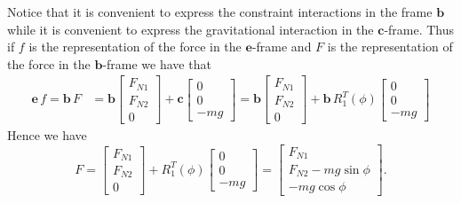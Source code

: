 \documentclass[graybox,envcountchap,sectrefs]{svmonoMuga}
\begin{document}
Notice that it is convenient to express the constraint interactions in the frame $\mathbf{b}$ while it is convenient to express the gravitational interaction in the $\mathbf{c}$-frame. Thus if $f$ is the representation of the force in the $\mathbf{e}$-frame and $F$ is the representation of the force in the $\mathbf{b}$-frame we have that
\begin{align*}
\mathbf{e}\,f=\mathbf{b}\,F&=
\mathbf{b}\begin{bmatrix}
F_{N1}\\ F_{N2}\\ 0
\end{bmatrix}
+\mathbf{c}
\begin{bmatrix}
0\\0\\-mg
\end{bmatrix}=\mathbf{b}\begin{bmatrix}
F_{N1}\\ F_{N2}\\ 0
\end{bmatrix}
+\mathbf{b}\,R_1^T(\phi)
\begin{bmatrix}
0\\0\\-mg
\end{bmatrix}
\end{align*}
Hence we have
\begin{equation*}
F=
\begin{bmatrix}
F_{N1}\\ F_{N2}\\ 0
\end{bmatrix}
+R_1^T(\phi)
\begin{bmatrix}
0\\0\\-mg
\end{bmatrix}=
\begin{bmatrix}
F_{N1}\\ F_{N2}-mg\sin{\phi}\\ -mg\cos{\phi}
\end{bmatrix}.
\end{equation*}
\end{document}
